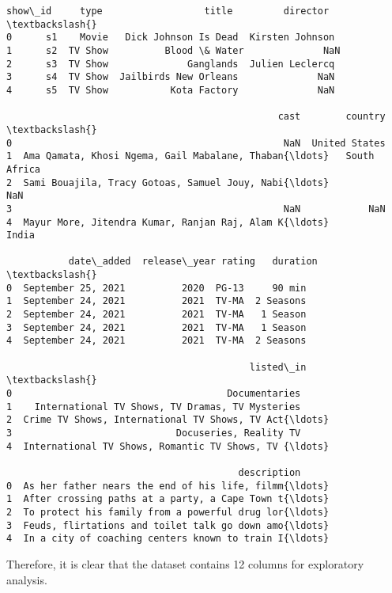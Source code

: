 \documentclass[11pt]{article}
\makeatletter
\newcommand{\boxspacing}{\kern\kvtcb@left@rule\kern\kvtcb@boxsep}
\newcommand{\prompt}[4]{
        {\ttfamily\llap{{\color{#2}[#3]:\hspace{3pt}#4}}\vspace{-\baselineskip}}
    }
\makeatother
\begin{document}
            \begin{tcolorbox}[breakable, size=fbox, boxrule=.5pt, pad at break*=1mm, opacityfill=0]
\prompt{Out}{outcolor}{5}{\boxspacing}
\begin{Verbatim}[commandchars=\\\{\}]
  show\_id     type                  title         director  \textbackslash{}
0      s1    Movie   Dick Johnson Is Dead  Kirsten Johnson
1      s2  TV Show          Blood \& Water              NaN
2      s3  TV Show              Ganglands  Julien Leclercq
3      s4  TV Show  Jailbirds New Orleans              NaN
4      s5  TV Show           Kota Factory              NaN

                                                cast        country  \textbackslash{}
0                                                NaN  United States
1  Ama Qamata, Khosi Ngema, Gail Mabalane, Thaban{\ldots}   South Africa
2  Sami Bouajila, Tracy Gotoas, Samuel Jouy, Nabi{\ldots}            NaN
3                                                NaN            NaN
4  Mayur More, Jitendra Kumar, Ranjan Raj, Alam K{\ldots}          India

           date\_added  release\_year rating   duration  \textbackslash{}
0  September 25, 2021          2020  PG-13     90 min
1  September 24, 2021          2021  TV-MA  2 Seasons
2  September 24, 2021          2021  TV-MA   1 Season
3  September 24, 2021          2021  TV-MA   1 Season
4  September 24, 2021          2021  TV-MA  2 Seasons

                                           listed\_in  \textbackslash{}
0                                      Documentaries
1    International TV Shows, TV Dramas, TV Mysteries
2  Crime TV Shows, International TV Shows, TV Act{\ldots}
3                             Docuseries, Reality TV
4  International TV Shows, Romantic TV Shows, TV {\ldots}

                                         description
0  As her father nears the end of his life, filmm{\ldots}
1  After crossing paths at a party, a Cape Town t{\ldots}
2  To protect his family from a powerful drug lor{\ldots}
3  Feuds, flirtations and toilet talk go down amo{\ldots}
4  In a city of coaching centers known to train I{\ldots}
\end{Verbatim}
\end{tcolorbox}
        
    Therefore, it is clear that the dataset contains 12 columns for
exploratory analysis.
\end{document}
